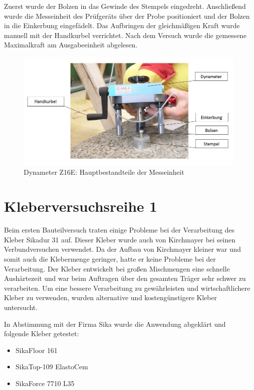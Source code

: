Zuerst wurde der Bolzen in das Gewinde des Stempels eingedreht. Anschließend wurde die Messeinheit des Prüfgeräts über der Probe positioniert und der Bolzen in die Einkerbung eingefädelt. Das Aufbringen der gleichmäßigen Kraft wurde manuell mit der Handkurbel verrichtet. Nach dem Versuch wurde die gemessene Maximalkraft am Ausgabeeinheit abgelesen.




\begin{figure}
\begin{center}
\includegraphics[scale =0.6]{Verbindungsmittel/kleber/dynameter.jpg}
\caption{ Dynameter Z16E: Hauptbestandteile der Messeinheit }
\label{dynameter}
\end{center}
\end{figure}




\section{Kleberversuchsreihe 1}

Beim ersten Bauteilversuch traten einige Probleme bei der Verarbeitung des Kleber Sikadur 31 auf. Dieser Kleber wurde auch von Kirchmayer bei seinen Verbundversuchen verwendet. Da der Aufbau von Kirchmayer kleiner war und somit auch die Klebermenge geringer, hatte er keine Probleme bei der Verarbeitung. Der Kleber entwickelt bei großen Mischmengen eine schnelle Aushärtezeit und war beim Auftragen über den gesamten Träger sehr schwer zu verarbeiten. Um eine bessere Verarbeitung zu gewährleisten und wirtschaftlichere Kleber zu verwenden, wurden alternative und kostengünstigere Kleber untersucht. 


In Abstimmung mit der Firma Sika wurde die Anwendung abgeklärt und folgende Kleber getestet:
\begin{itemize}
\item SikaFloor 161
\item SikaTop-109 ElastoCem
\item SikaForce 7710 L35
\end{itemize}




